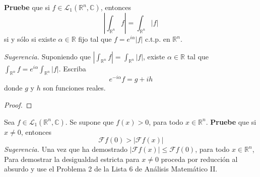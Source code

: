 \documentclass[12pt]{report}
\theoremstyle{largebreak}
\renewcommand{\leq}{\ensuremath{\leqslant}}
\newcommand\abs[1]{\ensuremath{\left|#1\right|}}
\newcommand{\fou}[1]{\ensuremath{\mathcal{F}#1}}
\begin{document}
    \begin{excer}
        \textbf{Pruebe} que si $f\in\mathcal{L}_1(\mathbb{R}^n,\mathbb{C})$, entonces
        \begin{equation*}
            \abs{\int_{\mathbb{R}^n}f}=\int_{\mathbb{R}^n}\abs{f}
        \end{equation*}
        si y sólo si existe $\alpha\in\mathbb{R}$ fijo tal que $f=e^{i\alpha}\abs{f}$ c.t.p. en $\mathbb{R}^n$.

        \textit{Sugerencia.} Suponiendo que $\abs{\int_{\mathbb{R}^n}f}=\int_{\mathbb{R}^n}\abs{f}$, existe $\alpha\in\mathbb{R}$ tal que $\int_{\mathbb{R}^n}f=e^{i\alpha}\int_{\mathbb{R}^n}\abs{f}$. Escriba
        \begin{equation*}
            e^{ -i\alpha}f=g+ih
        \end{equation*}
        donde $g$ y $h$ son funciones reales.
    \end{excer}

    \begin{proof}
        
    \end{proof}

    \begin{excer}
        Sea $f\in\mathcal{L}_1(\mathbb{R}^n,\mathbb{C})$. Se supone que $f(x)>0$, para todo $x\in\mathbb{R}^n$. \textbf{Pruebe} que si $x\neq0$, entonces
        \begin{equation*}
            \fou{f}(0)>\abs{\fou{f}(x)}
        \end{equation*}
        \textit{Sugerencia.} Una vez que ha demostrado $\abs{\fou{f}(x)}\leq\fou{f}(0)$, para todo $x\in\mathbb{R}^n$, Para demostrar la desigualdad estricta para $x\neq0$ proceda por reducción al absurdo y use el Problema 2 de la Lista 6 de Análisis Matemático II.
    \end{excer}
\end{document}
